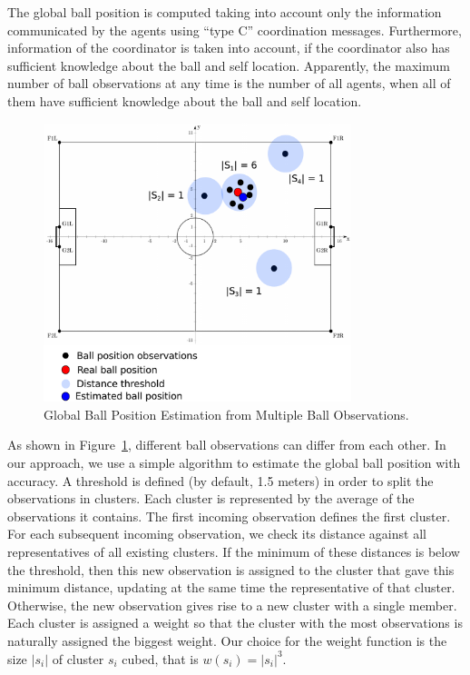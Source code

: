 The global ball position is computed taking into account only the information communicated by the agents using ``type C'' coordination messages. Furthermore, information of the coordinator is taken into account, if the coordinator also has sufficient knowledge about the ball and self location. Apparently, the maximum number of ball observations at any time is the number of all agents, when all of them have sufficient knowledge about the ball and self location.
\begin{figure}[t!]
\centering
  \includegraphics[width=0.8\textwidth]{Chapter4/figures/Ball.pdf}
  \caption{Global Ball Position Estimation from Multiple Ball Observations.} 
  \label{fig:Ball}
\end{figure}
As shown in Figure~\ref{fig:Ball}, different ball observations can differ from each other. In our approach, we use a simple algorithm to estimate the global ball position with accuracy. A threshold is defined (by default, 1.5 meters) in order to split the observations in clusters. %
Each cluster is represented by the average of the observations it contains. The first incoming observation defines the first cluster. For each subsequent incoming observation, we check its distance against all representatives of all existing clusters. If the minimum of these distances is below the threshold, then this new observation is assigned to the cluster that gave this minimum distance, updating at the same time the representative of that cluster. Otherwise, the new observation gives rise to a new cluster with a single member. Each cluster is assigned a weight so that the cluster with the most observations is naturally assigned the biggest weight. Our choice for the weight function is the size $|s_i|$ of cluster $s_i$ cubed, that is $w(s_i) = |s_i|^3$.
